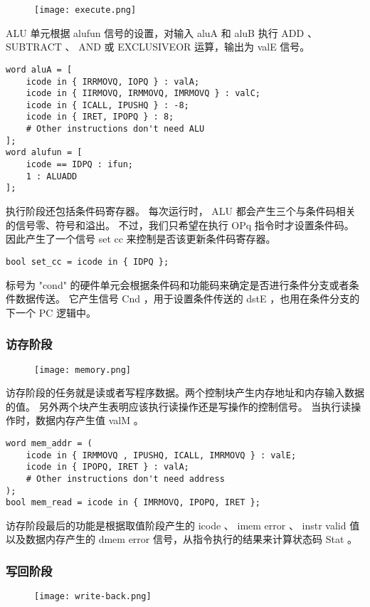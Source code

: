 \begin{figure}[H]
    \centering
    \texttt{[image: execute.png]}
\end{figure}

ALU 单元根据 alufun 信号的设置，对输入 aluA 和 aluB 执行 ADD 、 SUBTRACT 、 AND 或 EXCLUSIVEOR 运算，输出为 valE 信号。
\begin{lstlisting}[style=CStyle]
word aluA = [
    icode in { IRRMOVQ, IOPQ } : valA;
    icode in { IIRMOVQ, IRMMOVQ, IMRMOVQ } : valC;
    icode in { ICALL, IPUSHQ } : -8;
    icode in { IRET, IPOPQ } : 8;
    # Other instructions don't need ALU
];
word alufun = [
    icode == IDPQ : ifun;
    1 : ALUADD
];
\end{lstlisting}

执行阶段还包括条件码寄存器。
每次运行时， ALU 都会产生三个与条件码相关的信号零、符号和溢出。
不过，我们只希望在执行 OPq 指令时才设置条件码。
因此产生了一个信号 set cc 来控制是否该更新条件码寄存器。
\begin{lstlisting}[style=CStyle]
bool set_cc = icode in { IDPQ };
\end{lstlisting}

标号为 "cond" 的硬件单元会根据条件码和功能码来确定是否进行条件分支或者条件数据传送。
它产生信号 Cnd ，用于设置条件传送的 dstE ，也用在条件分支的下一个 PC 逻辑中。

\subsubsection{访存阶段}
\begin{figure}[H]
    \centering
    \texttt{[image: memory.png]}
\end{figure}

访存阶段的任务就是读或者写程序数据。两个控制块产生内存地址和内存输入数据的值。
另外两个块产生表明应该执行读操作还是写操作的控制信号。
当执行读操作时，数据内存产生值 valM 。
\begin{lstlisting}[style=CStyle]
word mem_addr = (
    icode in { IRMMOVQ , IPUSHQ, ICALL, IMRMOVQ } : valE;
    icode in { IPOPQ, IRET } : valA;
    # Other instructions don't need address
);
bool mem_read = icode in { IMRMOVQ, IPOPQ, IRET };
\end{lstlisting}

访存阶段最后的功能是根据取值阶段产生的 icode 、 imem error 、 instr valid 值
以及数据内存产生的 dmem error 信号，从指令执行的结果来计算状态码 Stat 。

\subsubsection{写回阶段}
\begin{figure}[H]
    \centering
    \texttt{[image: write-back.png]}
\end{figure}

